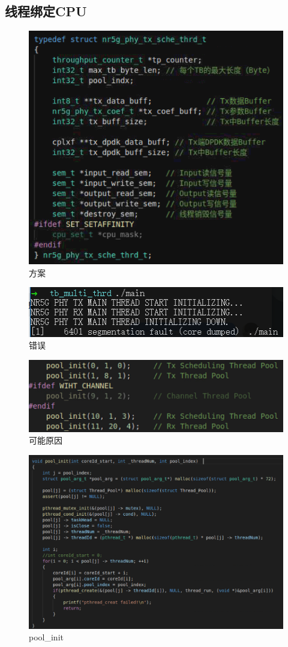 \documentclass{article}
\begin{document}
\subsection{线程绑定CPU}
\begin{figure}[H]
	\centering
	\includegraphics[width = .8\textwidth]{cpu.png}
	\caption{方案}
\end{figure}
\begin{figure}[H]
	\centering
	\includegraphics[width = .8\textwidth]{err.png}
	\caption{错误}
\end{figure}
\begin{figure}[H]
	\centering
	\includegraphics[width = .8\textwidth]{reason0.png}
	\caption{可能原因}
\end{figure}
\begin{figure}[H]
	\centering
	\includegraphics[width = .8\textwidth]{reason.png}
	\caption{pool\_init}
\end{figure}
\end{document}
